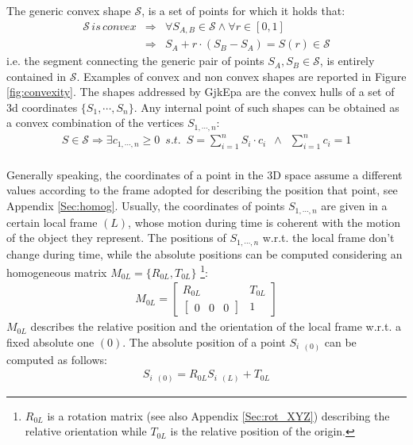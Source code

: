 \documentclass{article}
\begin{document}
The generic convex shape  $\mathcal{S}$, is a set of points for which it holds that:
\begin{eqnarray}
\mathcal{S} \mathit{\,is\,convex} & \Rightarrow & \forall S_{A,B} \in \mathcal{S} \wedge \forall r\in[0,1] 
\\
& \Rightarrow & S_A + r \cdot (S_B - S_A) = S(r) \in \mathcal{S}
\end{eqnarray}
i.e. the segment connecting the generic pair of points $S_A, S_B \in \mathcal{S}$, is entirely contained in $\mathcal{S}$. Examples of convex and non convex shapes are reported in Figure \ref{fig:convexity}.
The shapes addressed by GjkEpa are the convex hulls of a set of 3d coordinates $\lbrace S_1, \cdots, S_n \rbrace$. Any internal point of such shapes can be obtained as a convex combination of the vertices $S_{1,\cdots,n}$:
\begin{eqnarray}
S \in \mathcal{S} \Rightarrow \exists c_{1,\cdots,n} \geq 0 \,\,\, s.t. \,\,\, 
S = \sum_{i=1}^n S_i \cdot c_i \,\,\, \wedge \,\,\, \sum_{i=1}^n c_i = 1
\end{eqnarray}
\\
Generally speaking, the coordinates of a point in the 3D space assume a different values according to the frame adopted for describing the position that point, see Appendix \ref{Sec:homog}. 
Usually, the coordinates of points $S_{1,\cdots,n}$ are given in a certain local frame $(L)$, whose motion during time is coherent with the motion of the object they represent. The positions of $S_{1,\cdots,n}$ w.r.t. the local frame don't change during time, while the absolute positions can be computed considering an homogeneous matrix $M_{0L}=\lbrace R_{0L}, T_{0L} \rbrace$ \footnote{$R_{0L}$  is a rotation matrix (see also Appendix \ref{Sec:rot_XYZ}) describing the relative orientation while $T_{0L}$ is the relative position of the origin.}:
\begin{eqnarray}
M_{0L} = \begin{bmatrix} R_{0L} & T_{0L} \\ \begin{bmatrix} 0 & 0 & 0 \end{bmatrix} & 1  \end{bmatrix}
 \end{eqnarray} 
$M_{0L}$ describes the relative position and the orientation of the local frame w.r.t. a fixed absolute one $(0)$. The absolute position of a point $S_{i\,\,\,(0)}$ can be computed as follows:
\begin{eqnarray}
S_{i\,\,\,(0)} = R_{0L} S_{i\,\,\,(L)} + T_{0L}
\end{eqnarray}
\end{document}
